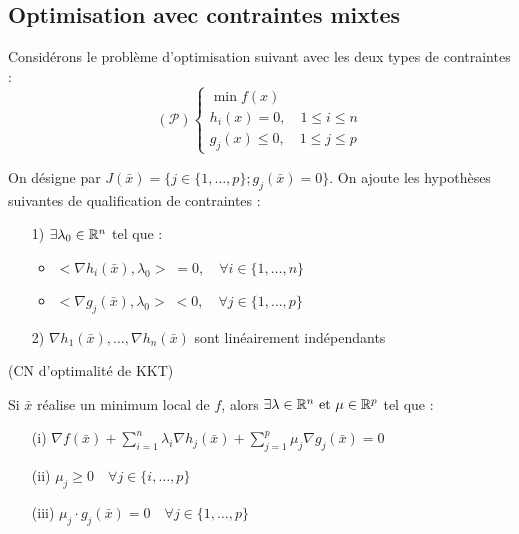 \subsection{Optimisation avec contraintes mixtes}

Considérons le problème d'optimisation suivant avec les deux types de contraintes : \[ (\mathcal{P}) \begin{cases}\min f(x) \\ h_i(x) = 0 , \quad 1 \leq i \leq n \\ g_j(x) \leq 0 , \quad 1 \leq j \leq p \end{cases} \]

On désigne par $J(\bar{x})=\{j \in \{1, \dots , p\}; g_j(\bar{x}) = 0\}$.
On ajoute les hypothèses suivantes de qualification de contraintes :
\begin{itemize}
	\item[1)] $\exists \lambda_0 \in \mathbb{R}^n$ tel que :
	\begin{itemize}
		\item $<\nabla h_i(\bar{x}), \lambda_0> \; = 0, \quad \forall i \in \{ 1, \dots , n \}$
		\item $<\nabla g_j(\bar{x}), \lambda_0> \; < 0, \quad \forall j \in \{ 1, \dots , p \}$
	\end{itemize}
	\item[2)] $\nabla h_1(\bar{x}), \dots, \nabla h_n(\bar{x})$ sont linéairement indépendants
\end{itemize}

\begin{theoreme} (CN d'optimalité de KKT)

Si $\bar{x}$ réalise un minimum local de $f$, alors $\exists \lambda \in \mathbb{R}^n \text{  et } \mu \in \mathbb{R}^p$ tel que :
	\begin{itemize}
		\item[(i)] $\displaystyle \nabla f(\bar{x}) + \sum_{i=1}^n \lambda _i \nabla h_j (\bar{x}) + \sum_{j=1}^p \mu _j \nabla g_j (\bar{x}) = 0$
		\item[(ii)] $ \mu _j \geq 0 \quad \forall j \in \{ i, \dots , p \}$
		\item[(iii)] $ \mu _j \cdot g_j(\bar{x}) = 0 \quad \forall j \in \{ 1, \dots , p \}$
	\end{itemize}
\end{theoreme}

